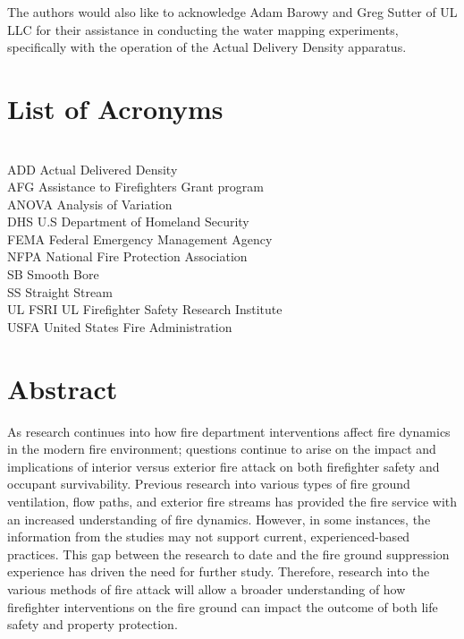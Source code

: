 \documentclass[12pt,oneside]{book}
\begin{document}
The authors would also like to acknowledge Adam Barowy and Greg Sutter of UL LLC for their assistance in conducting the water mapping experiments, specifically with the operation of the Actual Delivery Density apparatus.

\cleardoublepage
{}
{}
\tableofcontents

\cleardoublepage
{}
{}
\listoffigures

\cleardoublepage
{}
{}
\listoftables

\chapter{List of Acronyms}

\begin{tabbing}
\hspace{1.5in} \= \\
ADD \> Actual Delivered Density \\
AFG \> Assistance to Firefighters Grant program  \\
ANOVA \> Analysis of Variation \\
DHS \> U.S Department of Homeland Security   \\   
FEMA \> Federal Emergency Management Agency  \\
NFPA \> National Fire Protection Association \\
SB \> Smooth Bore \\
SS \> Straight Stream \\
UL FSRI \> UL Firefighter Safety Research Institute \\
USFA \> United States Fire Administration  \\
\end{tabbing}

\newpage

\mainmatter

\chapter*{\centering Abstract}

As research continues into how fire department interventions affect fire dynamics in the modern fire environment; questions continue to arise on the impact and implications of interior versus exterior fire attack on both firefighter safety and occupant survivability. Previous research into various types of fire ground ventilation, flow paths, and exterior fire streams has provided the fire service with an increased understanding of fire dynamics. However, in some instances, the information from the studies may not support current, experienced-based practices. This gap between the research to date and the fire ground suppression experience has driven the need for further study. Therefore, research into the various methods of fire attack will allow a broader understanding of how firefighter interventions on the fire ground can impact the outcome of both life safety and property protection. 
\end{document}
